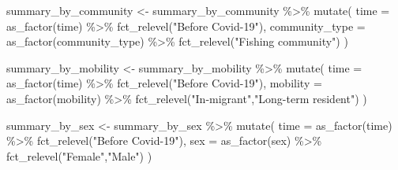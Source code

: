 \documentclass[
  letterpaper,
  DIV=11,
  numbers=noendperiod]{scrartcl}
\newenvironment{Shaded}{\begin{snugshade}}{\end{snugshade}}
\newcommand{\AttributeTok}[1]{\textcolor[rgb]{0.40,0.45,0.13}{#1}}
\newcommand{\FunctionTok}[1]{\textcolor[rgb]{0.28,0.35,0.67}{#1}}
\newcommand{\NormalTok}[1]{\textcolor[rgb]{0.00,0.23,0.31}{#1}}
\newcommand{\OtherTok}[1]{\textcolor[rgb]{0.00,0.23,0.31}{#1}}
\newcommand{\SpecialCharTok}[1]{\textcolor[rgb]{0.37,0.37,0.37}{#1}}
\newcommand{\StringTok}[1]{\textcolor[rgb]{0.13,0.47,0.30}{#1}}
\begin{document}
\begin{Shaded}
\begin{Highlighting}[]
\NormalTok{summary\_by\_community }\OtherTok{\textless{}{-}}\NormalTok{  summary\_by\_community }\SpecialCharTok{\%\textgreater{}\%} 
  \FunctionTok{mutate}\NormalTok{(}
   \AttributeTok{time =} \FunctionTok{as\_factor}\NormalTok{(time) }\SpecialCharTok{\%\textgreater{}\%} 
           \FunctionTok{fct\_relevel}\NormalTok{(}\StringTok{"Before Covid{-}19"}\NormalTok{),}
   \AttributeTok{community\_type =} \FunctionTok{as\_factor}\NormalTok{(community\_type) }\SpecialCharTok{\%\textgreater{}\%} 
     \FunctionTok{fct\_relevel}\NormalTok{(}\StringTok{"Fishing community"}\NormalTok{)}
\NormalTok{  )}
\end{Highlighting}
\end{Shaded}

\begin{Shaded}
\begin{Highlighting}[]
\NormalTok{summary\_by\_mobility }\OtherTok{\textless{}{-}}\NormalTok{  summary\_by\_mobility }\SpecialCharTok{\%\textgreater{}\%} 
  \FunctionTok{mutate}\NormalTok{(}
    \AttributeTok{time =} \FunctionTok{as\_factor}\NormalTok{(time) }\SpecialCharTok{\%\textgreater{}\%} 
           \FunctionTok{fct\_relevel}\NormalTok{(}\StringTok{"Before Covid{-}19"}\NormalTok{),}
    \AttributeTok{mobility =} \FunctionTok{as\_factor}\NormalTok{(mobility) }\SpecialCharTok{\%\textgreater{}\%} 
      \FunctionTok{fct\_relevel}\NormalTok{(}\StringTok{"In{-}migrant"}\NormalTok{,}\StringTok{"Long{-}term resident"}\NormalTok{)}
\NormalTok{  )}
\end{Highlighting}
\end{Shaded}

\begin{Shaded}
\begin{Highlighting}[]
\NormalTok{summary\_by\_sex }\OtherTok{\textless{}{-}}\NormalTok{  summary\_by\_sex }\SpecialCharTok{\%\textgreater{}\%} 
  \FunctionTok{mutate}\NormalTok{(}
    \AttributeTok{time =} \FunctionTok{as\_factor}\NormalTok{(time) }\SpecialCharTok{\%\textgreater{}\%} 
           \FunctionTok{fct\_relevel}\NormalTok{(}\StringTok{"Before Covid{-}19"}\NormalTok{),}
    \AttributeTok{sex =} \FunctionTok{as\_factor}\NormalTok{(sex) }\SpecialCharTok{\%\textgreater{}\%} 
      \FunctionTok{fct\_relevel}\NormalTok{(}\StringTok{"Female"}\NormalTok{,}\StringTok{"Male"}\NormalTok{)}
\NormalTok{  )}
\end{Highlighting}
\end{Shaded}
\end{document}
